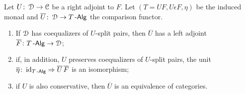 \documentclass[a4paper,11pt,oneside,openany]{scrbook}
\begin{document}
\begin{teo}[Beck]\label{Beck} Let $U\colon\operatorname{\mathcal{D}}\to\operatorname{\mathcal{C}}$ be a right adjoint to $F$.
	Let $(T=UF, U\epsilon F, \eta)$ be the induced monad and
	$\overline{U}\colon\operatorname{\mathcal{D}}\to T\operatorname{-\mathsf{Alg}}$ the comparison functor.
	\begin{enumerate}
		\item If $\operatorname{\mathcal{D}}$ has coequalizers of $U$-split pairs, then $\overline{U}$ has a left adjoint $\overline{F}\colon T\operatorname{-\mathsf{Alg}}\to\operatorname{\mathcal{D}}$;
		\item if, in addition, $U$ preserves coequalizers of $U$-split pairs, the unit $\overline{\eta}\colon\operatorname{id}_{T\operatorname{-\mathsf{Alg}}}\Rightarrow\overline{U}\hspace{.5mm} \overline{F}$ is an isomorphism;
		\item if $U$ is also conservative, then $\overline{U}$ is an equivalence of categories.
	\end{enumerate}
\end{teo}
\end{document}
